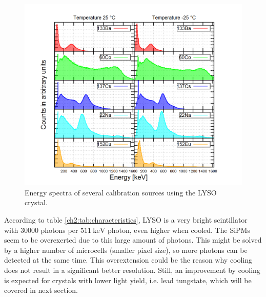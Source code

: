 \begin{figure}[H]
	\centering
	\includegraphics[width=1\linewidth]{./plots/energy/lyso_energy.png}
	\caption[LYSO energy spectra]{Energy spectra of several calibration sources using the LYSO crystal.}
	\label{fig:ch5:lyso_energy}
\end{figure}
\newpage
\noindent
According to table \ref{ch2:tab:characteristics}, LYSO is a very bright scintillator with 30000 photons per $\SI{511}{\keV}$ photon, even higher when cooled. The SiPMs seem to be overexerted due to this large amount of photons. This might be solved by a higher number of microcells (smaller pixel size), so more photons can be detected at the same time. This overextension could be the reason why cooling does not result in a significant better resolution. Still, an improvement by cooling is expected for crystals with lower light yield, i.e. lead tungstate, which will be covered in next section.      

\subsection{\pwo{}}

